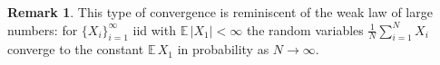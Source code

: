 \documentclass[letterpaper,11pt,oneside,reqno]{amsart}
\numberwithin{equation}{section}
\theoremstyle{definition}
\newtheorem{remark}[proposition]{Remark}
\begin{document}
\begin{remark}
	This type of convergence is reminiscent of the weak law of large numbers: for
	$\{X_i\}_{i=1}^\infty$ iid with $\mathbb E\, |X_1| <\infty$ the random
	variables $\frac{1}N\sum_{i=1}^N X_i$ converge to the constant $\mathbb E \,
	X_1$ in probability as $N\to\infty$.
\end{remark}





\end{document}
